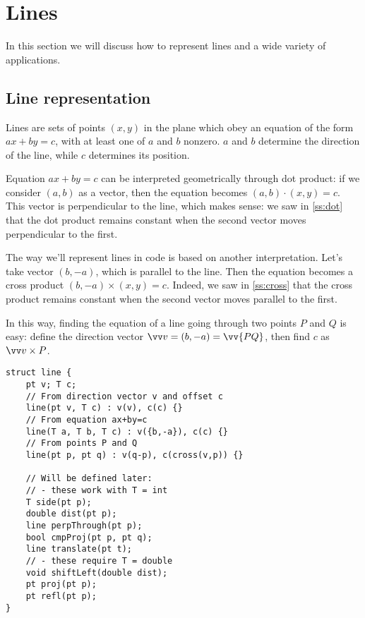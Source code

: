 \section{Lines}\label{s:lines}
In this section we will discuss how to represent lines and a wide variety of applications.

\subsection{Line representation}\label{ss:line-rep}
Lines are sets of points $(x,y)$ in the plane which obey an equation of the form $ax+by=c$, with at least one of $a$ and $b$ nonzero. $a$ and $b$ determine the direction of the line, while $c$ determines its position.


Equation $ax+by=c$ can be interpreted geometrically through dot product: if we consider $(a,b)$ as a vector, then the equation becomes $(a,b)\cdot(x,y) = c$. This vector is perpendicular to the line, which makes sense: we saw in \ref{ss:dot} that the dot product remains constant when the second vector moves perpendicular to the first.


The way we'll represent lines in code is based on another interpretation. Let's take vector $(b,-a)$, which is parallel to the line. Then the equation becomes a cross product $(b,-a)\times(x,y) = c$. Indeed, we saw in \ref{ss:cross} that the cross product remains constant when the second vector moves parallel to the first. 


In this way, finding the equation of a line going through two points $P$ and $Q$ is easy: define the direction vector $\dir = (b,-a) = \vv{PQ}$, then find $c$ as $\dir\times P$. 
\begin{lstlisting}
struct line {
    pt v; T c;
    // From direction vector v and offset c
    line(pt v, T c) : v(v), c(c) {}
    // From equation ax+by=c
    line(T a, T b, T c) : v({b,-a}), c(c) {}
    // From points P and Q
    line(pt p, pt q) : v(q-p), c(cross(v,p)) {}
    
    // Will be defined later:
    // - these work with T = int
    T side(pt p);
    double dist(pt p);
    line perpThrough(pt p);
    bool cmpProj(pt p, pt q);
    line translate(pt t);
    // - these require T = double
    void shiftLeft(double dist);
    pt proj(pt p);
    pt refl(pt p);
}
\end{lstlisting}

